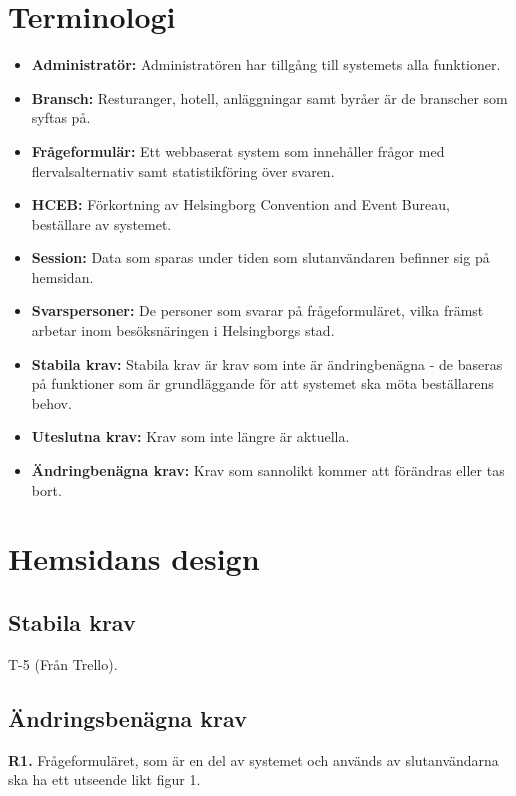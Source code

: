 \documentclass{article}
\begin{document}
    \section{Terminologi}
    \begin{itemize}
        \item \textbf{Administratör:} Administratören har tillgång till systemets alla funktioner.
        \item \textbf{Bransch:} Resturanger, hotell, anläggningar samt byråer är de branscher som syftas på.
         \item \textbf{Frågeformulär:} Ett webbaserat system som innehåller frågor med flervalsalternativ samt statistikföring över svaren.
        \item \textbf{HCEB:} Förkortning av Helsingborg Convention and Event Bureau, beställare av systemet.
        \item \textbf{Session:} Data som sparas under tiden som slutanvändaren befinner sig på hemsidan.
        \item \textbf{Svarspersoner:}  De personer som svarar på frågeformuläret, vilka främst arbetar inom besöksnäringen i Helsingborgs stad. 
        \item\textbf{Stabila krav:}  Stabila krav är krav som inte är ändringbenägna - de baseras på funktioner som är grundläggande för att systemet ska möta beställarens behov.
         \item \textbf{Uteslutna krav:}  Krav som inte längre är aktuella.
        \item \textbf{Ändringbenägna krav:}  Krav som sannolikt kommer att förändras eller tas bort.
       
    \end{itemize}
    \newpage
    \section{Hemsidans design}
    
    \subsection{Stabila krav}
    
    T-5 (Från Trello).
     
    \subsection{Ändringsbenägna krav}
    
    \large{\textbf{R1.}}
    \normalsize{Frågeformuläret, som är en del av systemet och används av slutanvändarna ska ha ett utseende likt figur 1.}
    
\end{document}
